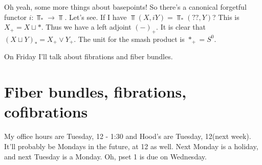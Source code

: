 Oh yeah, some more things about basepoints! So there's a canonical forgetful functor $i:\Top_\ast\to \Top$. Let's see. If I have $\Top(X,iY)=\Top_\ast(??,Y)$? This is $X_+=X\sqcup \ast$. Thus we have a left adjoint $(-)_+$. It is clear that $(X\sqcup Y)_\ast = X_+ \vee Y_+$. The unit for the smash product is $\ast_+ = S^0$.

On Friday I'll talk about fibrations and fiber bundles.
\section{Fiber bundles, fibrations, cofibrations}
My office hours are Tuesday, 12 - 1:30 and Hood's are Tuesday, 12(next week). It'll probably be Mondays in the future, at 12 as well. Next Monday is a holiday, and next Tuesday is a Monday. Oh, pset 1 is due on Wednesday.

